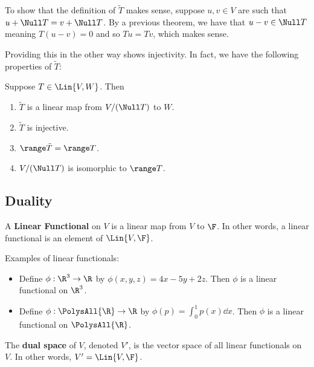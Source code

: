 To show that the definition of $\tilde{T}$ makes sense, suppose $u,v \in V$
are such that $u + \Null T = v + \Null T$. By a previous theorem, we have
that $u - v \in \Null T$ meaning $T (u-v) = 0$ and so $Tu = Tv$, which makes sense.

Providing this in the other way shows injectivity. In fact, we have
the following properties of $\tilde{T}$:

\begin{theorem}
   Suppose $T \in \Lin{V, W}$. Then
   \begin{enumerate}
      \item $\tilde{T}$ is a linear map from $V / (\Null T)$ to $W$.
      \item $\tilde{T}$ is injective.
      \item $\range \tilde{T} = \range T$.
      \item $V / (\Null T)$ is isomorphic to $\range T$.
   \end{enumerate}
\end{theorem}

\subsection{Duality}

\begin{definition} 
   A \textbf{Linear Functional} on $V$ is a linear map
   from $V$ to $\F$. In other words, a linear functional is
   an element of $\Lin{V, \F}$.
\end{definition}

\begin{example} Examples of linear functionals:
   \begin{itemize}
      \item Define $\phi: \R^3 \to \R$ by $\phi(x, y, z) = 4x-5y+2z$. Then
      $\phi$ is a linear functional on $\R^3$.
      \item Define $\phi: \PolysAll{\R} \to \R$ by $\phi(p) = \int_{0}^1 p(x) \dd{x}$. Then
      $\phi$ is a linear functional on $\PolysAll{\R}$.
   \end{itemize}
\end{example}

\begin{definition} 
   The \textbf{dual space} of $V$, denoted $V'$, is the vector space
   of all linear functionals on $V$. In other words, $V' = \Lin{V, \F}$.
\end{definition}

